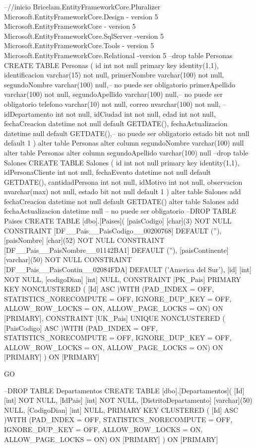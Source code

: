 --//inicio
Bricelam.EntityFrameworkCore.Pluralizer
Microsoft.EntityFrameworkCore.Design - version 5
Microsoft.EntityFrameworkCore - version 5
Microsoft.EntityFrameworkCore.SqlServer -version 5
Microsoft.EntityFrameworkCore.Tools - version 5
Microsoft.EntityFrameworkCore.Relational -version 5
--drop table Personas
CREATE TABLE Personas
(
	id int not null primary key identity(1,1),
	identificacion varchar(15) not null,
	primerNombre varchar(100) not null,
    segundoNombre  varchar(100)  null,-- no puede ser obligatorio
    primerApellido varchar(100) not null,
    segundoApellido varchar(100) null,-- no puede ser obligatorio
    telefono varchar(10) not null,
    correo nvarchar(100) not null,
    --idDepartamento int not null,
    idCiudad int not null,
    edad int not null,
    fechaCreacion datetime not null default GETDATE(),
	fechaActualizacion datetime null default GETDATE(),-- no puede ser obligatorio
    estado bit not null default 1
)
alter table Personas alter column segundoNombre  varchar(100)  null
alter table Personas alter column segundoApellido  varchar(100)  null
--drop table Salones
CREATE TABLE Salones
(
  id int not null primary key identity(1,1),
  idPersonaCliente int not null,
  fechaEvento datetime not null default GETDATE(),
  cantidadPersona int not null,
  idMotivo int not null,
  observacion nvarchar(max)  not null,
  estado bit not null default 1
)
alter table Salones add fechaCreacion datetime not null default GETDATE() 
alter table Salones add fechaActualizacion datetime null -- no puede ser obligatorio
--DROP TABLE Paises
CREATE TABLE [dbo].[Paises](
	[paisCodigo] [char](3) NOT NULL CONSTRAINT [DF__Pais__PaisCodigo__00200768]  DEFAULT (''),
	[paisNombre] [char](52) NOT NULL CONSTRAINT [DF__Pais__PaisNombre__01142BA1]  DEFAULT (''),
	[paisContinente] [varchar](50) NOT NULL CONSTRAINT [DF__Pais__PaisContin__02084FDA]  DEFAULT ('America del Sur'),
	[id] [int] NOT NULL,
	[codigoDian] [int] NULL,
 CONSTRAINT [PK_Pais] PRIMARY KEY NONCLUSTERED 
(
	[Id] ASC
)WITH (PAD_INDEX = OFF, STATISTICS_NORECOMPUTE = OFF, IGNORE_DUP_KEY = OFF, ALLOW_ROW_LOCKS = ON, ALLOW_PAGE_LOCKS = ON) ON [PRIMARY],
 CONSTRAINT [UK_Pais] UNIQUE NONCLUSTERED 
(
	[PaisCodigo] ASC
)WITH (PAD_INDEX = OFF, STATISTICS_NORECOMPUTE = OFF, IGNORE_DUP_KEY = OFF, ALLOW_ROW_LOCKS = ON, ALLOW_PAGE_LOCKS = ON) ON [PRIMARY]
) ON [PRIMARY]

GO

--DROP TABLE Departamentos
CREATE TABLE [dbo].[Departamentos](
	[Id] [int] NOT NULL,
	[IdPais] [int] NOT NULL,
	[DistritoDepartamento] [varchar](50) NULL,
	[CodigoDian] [int] NULL,
PRIMARY KEY CLUSTERED 
(
	[Id] ASC
)WITH (PAD_INDEX = OFF, STATISTICS_NORECOMPUTE = OFF, IGNORE_DUP_KEY = OFF, ALLOW_ROW_LOCKS = ON, ALLOW_PAGE_LOCKS = ON) ON [PRIMARY]
) ON [PRIMARY]


